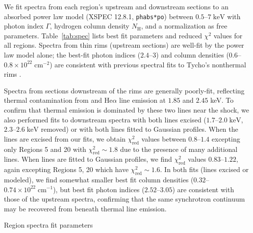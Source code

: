 \documentclass[iop, apj, numberedappendix]{emulateapj}
\newcommand*{\mt}{\mathrm}
\newcommand*{\unit}[1]{\;\mt{#1}}  %
\begin{document}
We fit spectra from each region's upstream and downstream sections to an
absorbed power law model (XSPEC 12.8.1, \texttt{phabs*po}) between $0.5$--$7
\unit{keV}$ with photon index $\Gamma$, hydrogen column density $N_{\mt{H}}$,
and a normalization as free parameters.  Table~\ref{tab:spec} lists best fit
parameters and reduced $\chi^2$ values for all regions.  Spectra from thin rims
(upstream sections) are well-fit by the power law model alone; the best-fit
photon indices ($2.4$--$3$) and column densities ($0.6$--$0.8 \times 10^{22}
\unit{cm^{-2}}$) are consistent with previous spectral fits to Tycho's
nonthermal rims \citep{hwang2002, cassam-chenai2007}.

Spectra from sections downstream of the rims are generally poorly-fit,
reflecting thermal contamination from  and  He$\alpha$
line emission at $1.85$ and $2.45$ keV.  To confirm that thermal emission is
dominated by these two lines near the shock, we also performed fits to
downstream spectra with both lines excised ($1.7$--$2.0 \unit{keV}$,
$2.3$--$2.6 \unit{keV}$ removed) or with both lines fitted to Gaussian
profiles.  When the lines are excised from our fits, we obtain
$\chi^2_{\mt{red}}$ values between $0.8$--$1.4$ excepting only Regions 5 and 20
with $\chi^2_{\mt{red}} \sim 1.8$ due to the presence of many additional lines.
When lines are fitted to Gaussian profiles, we find $\chi^2_{\mt{red}}$ values
$0.83$--$1.22$, again excepting Regions 5, 20 which have $\chi^2_{\mt{red}}
\sim 1.6$.  In both fits (lines excised or modeled), we find somewhat smaller
best fit column densities ($0.32$--$0.74 \times 10^{22} \unit{cm^{-1}}$),
but best fit photon indices ($2.52$--$3.05$) are consistent with those of the
upstream spectra, confirming that the same synchrotron continuum may be
recovered from beneath thermal line emission.

\begin{table}
    \scriptsize
    \centering
    \caption{Region spectra fit parameters\label{tab:spec}}
    
\end{table}

%    
\end{document}
